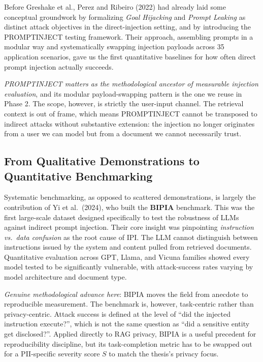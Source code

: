 \documentclass[12pt, a4paper]{article}
\begin{document}
Before Greshake et al., Perez and Ribeiro (2022) had already laid some conceptual groundwork by formalizing \emph{Goal Hijacking} and \emph{Prompt Leaking} as distinct attack objectives in the direct-injection setting, and by introducing the PROMPTINJECT testing framework. Their approach, assembling prompts in a modular way and systematically swapping injection payloads across 35 application scenarios, gave us the first quantitative baselines for how often direct prompt injection actually succeeds.

\begin{critbox}
\textit{PROMPTINJECT matters as the methodological ancestor of measurable injection evaluation}, and its modular payload-swapping pattern is the one we reuse in Phase 2. The scope, however, is strictly the user-input channel. The retrieval context is out of frame, which means PROMPTINJECT cannot be transposed to indirect attacks without substantive extension: the injection no longer originates from a user we can model but from a document we cannot necessarily trust.
\end{critbox}

\subsection{From Qualitative Demonstrations to Quantitative Benchmarking}

Systematic benchmarking, as opposed to scattered demonstrations, is largely the contribution of Yi et al.\ (2024), who built the \textbf{BIPIA} benchmark. This was the first large-scale dataset designed specifically to test the robustness of LLMs against indirect prompt injection. Their core insight was pinpointing \emph{instruction vs.\ data confusion} as the root cause of IPI. The LLM cannot distinguish between instructions issued by the system and content pulled from retrieved documents. Quantitative evaluation across GPT, Llama, and Vicuna families showed every model tested to be significantly vulnerable, with attack-success rates varying by model architecture and document type.

\begin{critbox}
\textit{Genuine methodological advance here}: BIPIA moves the field from anecdote to reproducible measurement. The benchmark is, however, task-centric rather than privacy-centric. Attack success is defined at the level of ``did the injected instruction execute?'', which is not the same question as ``did a sensitive entity get disclosed?''. Applied directly to RAG privacy, BIPIA is a useful precedent for reproducibility discipline, but its task-completion metric has to be swapped out for a PII-specific severity score $S$ to match the thesis's privacy focus.
\end{critbox}
\end{document}
